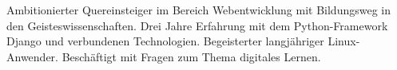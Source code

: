 
\begin{cvparagraph}


  Ambitionierter Quereinsteiger im Bereich Webentwicklung mit Bildungsweg in den Geisteswissenschaften.
  Drei Jahre Erfahrung mit dem Python-Framework Django und verbundenen Technologien.
  Begeisterter langjähriger Linux-Anwender.
  Beschäftigt mit Fragen zum Thema digitales Lernen.

\end{cvparagraph}
